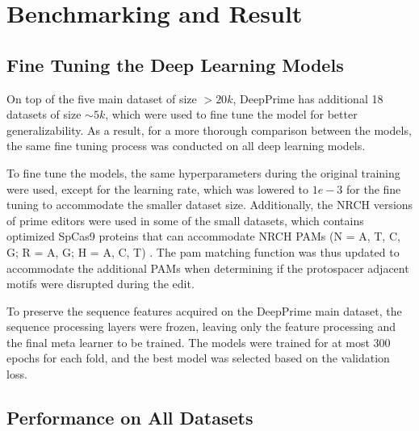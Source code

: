 \chapter{Benchmarking and Result}

\section{Fine Tuning the Deep Learning Models}

On top of the five main dataset of size $> 20k$, DeepPrime has additional 18 datasets of size $\sim5k$, which were used to fine tune the model for better generalizability. As a result, for a more thorough comparison between the models, the same fine tuning process was conducted on all deep learning models.

To fine tune the models, the same hyperparameters during the original training were used, except for the learning rate, which was lowered to $1e-3$ for the fine tuning to accommodate the smaller dataset size. Additionally, the NRCH versions of prime editors were used in some of the small datasets, which contains optimized SpCas9 proteins that can accommodate NRCH PAMs (N = A, T, C, G; R = A, G; H = A, C, T) \cite{millerContinuousEvolutionSpCas92020}. The pam matching function was thus updated to accommodate the additional PAMs when determining if the protospacer adjacent motifs were disrupted during the edit.

To preserve the sequence features acquired on the DeepPrime main dataset, the sequence processing layers were frozen, leaving only the feature processing and the final meta learner to be trained. The models were trained for at most 300 epochs for each fold, and the best model was selected based on the validation loss.


\section{Performance on All Datasets}

